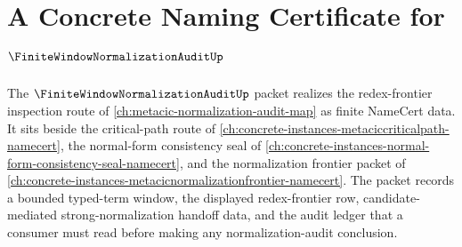 \chapter{A Concrete Naming Certificate for $\FiniteWindowNormalizationAuditUp$}
\label{ch:concrete-instances-finite-window-normalization-audit-namecert}

The $\FiniteWindowNormalizationAuditUp$ packet realizes the redex-frontier inspection route of \autoref{ch:metacic-normalization-audit-map} as finite NameCert data. It sits beside the critical-path route of \autoref{ch:concrete-instances-metaciccriticalpath-namecert}, the normal-form consistency seal of \autoref{ch:concrete-instances-normal-form-consistency-seal-namecert}, and the normalization frontier packet of \autoref{ch:concrete-instances-metacicnormalizationfrontier-namecert}. The packet records a bounded typed-term window, the displayed redex-frontier row, candidate-mediated strong-normalization handoff data, and the audit ledger that a consumer must read before making any normalization-audit conclusion.

